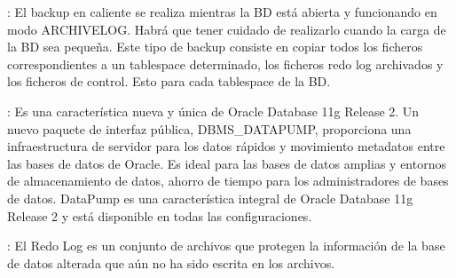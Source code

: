 \textbf{}: El backup en caliente se realiza mientras la BD está abierta y funcionando en modo ARCHIVELOG. Habrá que tener cuidado de realizarlo cuando la carga de la BD sea pequeña.
Este tipo de backup consiste en copiar todos los ficheros correspondientes a un tablespace determinado, los ficheros redo log archivados y los ficheros de control. Esto para cada tablespace de la BD.

\textbf{}: Es una característica nueva y única de Oracle Database 11g Release 2. Un nuevo paquete de interfaz pública, DBMS\_DATAPUMP, proporciona una infraestructura de servidor para los datos rápidos y movimiento metadatos entre las bases de datos de Oracle. Es ideal para las bases de datos amplias y entornos de almacenamiento de datos, ahorro de tiempo para los administradores de bases de datos. DataPump es una característica integral de Oracle Database 11g Release 2 y está disponible en todas las configuraciones.

 \textbf{}: El Redo Log es un conjunto de archivos que protegen la información de la base de datos alterada que aún no ha sido escrita en los archivos.

